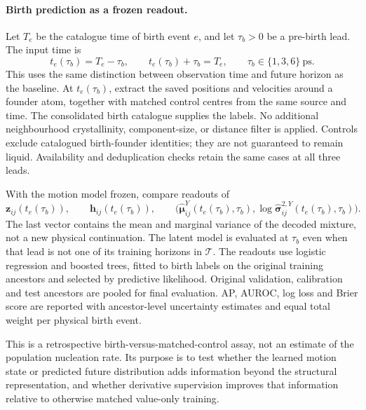 \documentclass[11pt,a4paper]{article}
\newcommand{\z}{\mathbf z}
\begin{document}
\paragraph{Birth prediction as a frozen readout.}
Let $T_e$ be the catalogue time of birth event $e$, and let $\tau_b>0$ be a
pre-birth lead. The input time is
\[
t_e(\tau_b)=T_e-\tau_b,\qquad t_e(\tau_b)+\tau_b=T_e,
\qquad \tau_b\in\{1,3,6\}\ \mathrm{ps}.
\]
This uses the same distinction between observation time and future horizon as
the baseline. At $t_e(\tau_b)$, extract the saved positions and velocities around a
founder atom, together with matched control centres from the same source and
time. The consolidated birth catalogue supplies the labels. No additional
neighbourhood crystallinity, component-size, or distance filter is applied.
Controls exclude catalogued birth-founder identities; they are not guaranteed
to remain liquid. Availability and deduplication checks retain the same cases
at all three leads.

With the motion model frozen, compare readouts of
\[
\z_{ij}(t_e(\tau_b)),\qquad
\mathbf h_{ij}(t_e(\tau_b)),\qquad
\bigl(\widehat{\boldsymbol\mu}^{Y}_{ij}(t_e(\tau_b),\tau_b),
       \log\widehat{\boldsymbol\sigma}^{2,Y}_{ij}(t_e(\tau_b),\tau_b)\bigr).
\]
The last vector contains the mean and marginal variance of the decoded mixture,
not a new physical continuation. The latent model is evaluated at $\tau_b$ even
when that lead is not one of its training horizons in $\mathcal T$.
The readouts use logistic regression and
boosted trees, fitted to birth labels on the original training ancestors and
selected by predictive likelihood. Original validation, calibration and test
ancestors are pooled for final evaluation. AP, AUROC, log loss and Brier score
are reported with ancestor-level uncertainty estimates and equal total weight
per physical birth event.

This is a retrospective birth-versus-matched-control assay, not an estimate of
the population nucleation rate. Its purpose is to test whether the learned
motion state or predicted future distribution adds information beyond the
structural representation, and whether derivative supervision improves that
information relative to otherwise matched value-only training.
\end{document}
